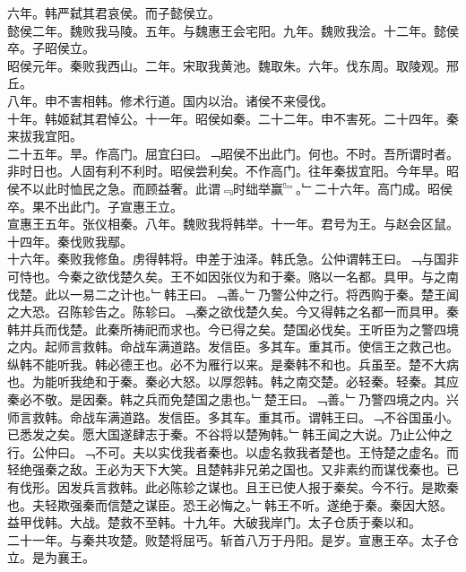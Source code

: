 \documentclass{zhvt-classic}
\begin{document}
\hspace*{2em}六年。韩严弑其君哀侯。而子懿侯立。\\
\hspace*{2em}懿侯二年。魏败我马陵。五年。与魏惠王会宅阳。九年。魏败我浍。十二年。懿侯卒。子昭侯立。\\
\hspace*{2em}昭侯元年。秦败我西山。二年。宋取我黄池。魏取朱。六年。伐东周。取陵观。邢丘。\\
\hspace*{2em}八年。申不害相韩。修术行道。国内以治。诸侯不来侵伐。\\
\hspace*{2em}十年。韩姬弑其君悼公。十一年。昭侯如秦。二十二年。申不害死。二十四年。秦来拔我宜阳。\\
\hspace*{2em}二十五年。旱。作高门。屈宜臼曰。﹁昭侯不出此门。何也。不时。吾所谓时者。非时日也。人固有利不利时。昭侯尝利矣。不作高门。往年秦拔宜阳。今年旱。昭侯不以此时恤民之急。而顾益奢。此谓﹃时绌举赢﹄。﹂二十六年。高门成。昭侯卒。果不出此门。子宣惠王立。\\
\hspace*{2em}宣惠王五年。张仪相秦。八年。魏败我将韩举。十一年。君号为王。与赵会区鼠。十四年。秦伐败我鄢。\\
\hspace*{2em}十六年。秦败我修鱼。虏得韩将。申差于浊泽。韩氏急。公仲谓韩王曰。﹁与国非可恃也。今秦之欲伐楚久矣。王不如因张仪为和于秦。赂以一名都。具甲。与之南伐楚。此以一易二之计也。﹂韩王曰。﹁善。﹂乃警公仲之行。将西购于秦。楚王闻之大恐。召陈轸告之。陈轸曰。﹁秦之欲伐楚久矣。今又得韩之名都一而具甲。秦韩并兵而伐楚。此秦所祷祀而求也。今已得之矣。楚国必伐矣。王听臣为之警四境之内。起师言救韩。命战车满道路。发信臣。多其车。重其币。使信王之救己也。纵韩不能听我。韩必德王也。必不为雁行以来。是秦韩不和也。兵虽至。楚不大病也。为能听我绝和于秦。秦必大怒。以厚怨韩。韩之南交楚。必轻秦。轻秦。其应秦必不敬。是因秦。韩之兵而免楚国之患也。﹂楚王曰。﹁善。﹂乃警四境之内。兴师言救韩。命战车满道路。发信臣。多其车。重其币。谓韩王曰。﹁不谷国虽小。已悉发之矣。愿大国遂肆志于秦。不谷将以楚殉韩。﹂韩王闻之大说。乃止公仲之行。公仲曰。﹁不可。夫以实伐我者秦也。以虚名救我者楚也。王恃楚之虚名。而轻绝强秦之敌。王必为天下大笑。且楚韩非兄弟之国也。又非素约而谋伐秦也。已有伐形。因发兵言救韩。此必陈轸之谋也。且王已使人报于秦矣。今不行。是欺秦也。夫轻欺强秦而信楚之谋臣。恐王必悔之。﹂韩王不听。遂绝于秦。秦因大怒。益甲伐韩。大战。楚救不至韩。十九年。大破我岸门。太子仓质于秦以和。\\
\hspace*{2em}二十一年。与秦共攻楚。败楚将屈丐。斩首八万于丹阳。是岁。宣惠王卒。太子仓立。是为襄王。\\
\end{document}
